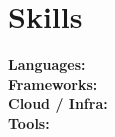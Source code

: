 \section*{Skills}

\noindent
\textbf{Languages:} \\
\textbf{Frameworks:} \\
\textbf{Cloud / Infra:} \\
\textbf{Tools:}
